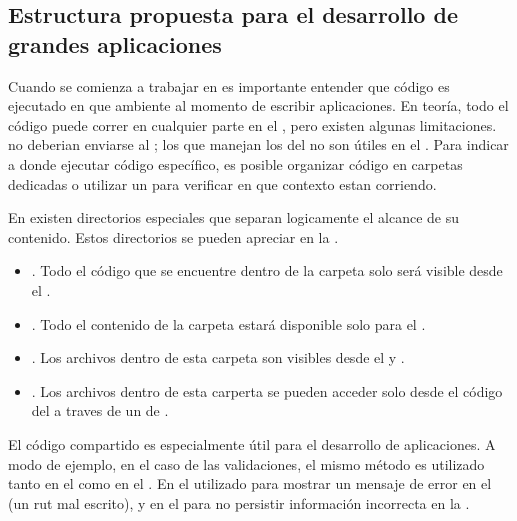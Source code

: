 \subsection{Estructura propuesta para el desarrollo de grandes aplicaciones}

Cuando se comienza a trabajar en \meteorNAME es importante entender que código es ejecutado en que ambiente al momento de escribir aplicaciones. En teoría, todo el código puede correr en cualquier parte en el \stackAS, pero existen algunas limitaciones. \apikeyAS no deberian enviarse al \clientAS; los \events que manejan los \clicks del \mouse no son útiles en el \serverAS. Para indicar a \meteorNAME donde ejecutar código específico, es posible organizar código en carpetas dedicadas o utilizar un \checkCPT para verificar en que contexto estan corriendo.

En \meteorNAME existen directorios especiales que separan logicamente el alcance de su contenido. Estos directorios se pueden apreciar en la .


	\begin{itemize}
		\item
			\textbf{\clientFolder}. Todo el código que se encuentre dentro de la carpeta  \clientFolder solo será visible desde el \clientSideAS.
		\item
			\textbf{\serverFolder}.  Todo el contenido de la carpeta \serverFolder estará disponible solo para el \serverSideAS.
		\item
			\textbf{\publicFolder}. Los archivos dentro de esta carpeta son visibles desde el \clientSideAS y \serverSideAS.
		\item
			\textbf{\privateFolder}. Los archivos dentro de esta carperta se pueden acceder solo desde el código del \serverAS a traves de un \apiAS de \assetsAS.
	\end{itemize}



El código compartido es especialmente útil para el desarrollo de aplicaciones. A modo de ejemplo, en el caso de las validaciones, el mismo método es utilizado tanto en el \clientSideAS como en el \serverSideAS. En el \clientSideAS utilizado para mostrar un mensaje de error en el \browserINT (un rut mal escrito), y en el \serverSideAS para no persistir información incorrecta en la \dataBaseDB.

